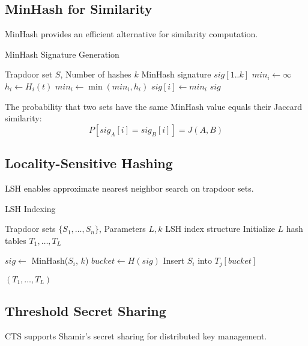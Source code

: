 \documentclass[../main_comprehensive.tex]{subfiles}
\begin{document}
\subsection{MinHash for Similarity}

MinHash provides an efficient alternative for similarity computation.

\begin{algorithm}
\caption{MinHash Signature Generation}
\label{alg:minhash}
\begin{algorithmic}[1]
\REQUIRE Trapdoor set $S$, Number of hashes $k$
\ENSURE MinHash signature $sig[1..k]$
  \STATE $min_i \leftarrow \infty$
    \STATE $h_i \leftarrow H_i(t)$ 
    \STATE $min_i \leftarrow \min(min_i, h_i)$
  \ENDFOR
  \STATE $sig[i] \leftarrow min_i$
\ENDFOR
\RETURN $sig$
\end{algorithmic}
\end{algorithm}

The probability that two sets have the same MinHash value equals their Jaccard similarity:
$$P[sig_A[i] = sig_B[i]] = J(A, B)$$

\subsection{Locality-Sensitive Hashing}

LSH enables approximate nearest neighbor search on trapdoor sets.

\begin{algorithm}
\caption{LSH Indexing}
\label{alg:lsh}
\begin{algorithmic}[1]
\REQUIRE Trapdoor sets $\{S_1, \ldots, S_n\}$, Parameters $L, k$
\ENSURE LSH index structure
\STATE Initialize $L$ hash tables $T_1, \ldots, T_L$

    \STATE $sig \leftarrow$ MinHash($S_i$, $k$) 
    \STATE $bucket \leftarrow H(sig)$ 
    \STATE Insert $S_i$ into $T_j[bucket]$
  \ENDFOR
\ENDFOR

\RETURN $(T_1, \ldots, T_L)$
\end{algorithmic}
\end{algorithm}

\subsection{Threshold Secret Sharing}

CTS supports Shamir's secret sharing for distributed key management.
\end{document}
